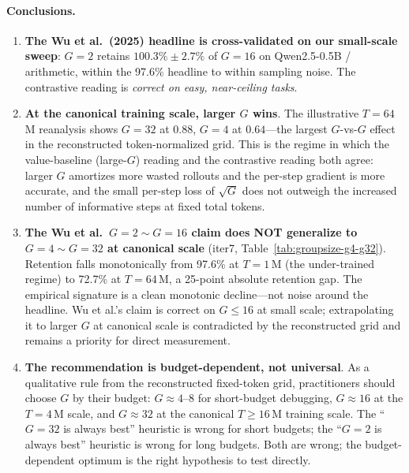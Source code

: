 \paragraph{Conclusions.}
\begin{enumerate}
  \item \textbf{The Wu et al.\ (2025) headline is cross-validated on our
        small-scale sweep}: $G{=}2$ retains $100.3\% \pm 2.7\%$ of
        $G{=}16$ on Qwen2.5-0.5B / arithmetic, within the 97.6\%
        headline to within sampling noise. The contrastive reading is
        \emph{correct on easy, near-ceiling tasks}.
  \item \textbf{At the canonical training scale, larger $G$ wins}.
        The illustrative $T{=}64\,$M reanalysis shows $G{=}32$ at
        $0.88$, $G{=}4$ at $0.64$---the largest $G$-vs-$G$ effect in the
        reconstructed token-normalized grid. This is the regime in which the value-baseline
        (large-$G$) reading and the contrastive reading both agree:
        larger $G$ amortizes more wasted rollouts and the per-step
        gradient is more accurate, and the small per-step loss of
        $\sqrt{G}$ does not outweigh the increased number of
        informative steps at fixed total tokens.
  \item \textbf{The Wu et al.\ $G{=}2{\sim}G{=}16$ claim does NOT
        generalize to $G{=}4{\sim}G{=}32$ at canonical scale}
        (iter7, Table~\ref{tab:groupsize-g4-g32}). Retention falls
        monotonically from 97.6\% at $T{=}1\,$M (the under-trained
        regime) to 72.7\% at $T{=}64\,$M, a 25-point absolute
        retention gap. The empirical signature is a clean monotonic
        decline---not noise around the headline. Wu et al.'s claim is
        correct on $G{\le}16$ at small scale; extrapolating it to
        larger $G$ at canonical scale is contradicted by the reconstructed
        grid and remains a priority for direct measurement.
  \item \textbf{The recommendation is budget-dependent, not universal}.
        As a qualitative rule from the reconstructed fixed-token grid,
        practitioners should choose $G$ by their budget:
        $G{\approx}4$--$8$ for short-budget debugging, $G{\approx}16$ at
        the $T{=}4\,$M scale, and $G{\approx}32$ at the canonical
        $T{\ge}16\,$M training scale. The ``$G{=}32$ is always best''
        heuristic is wrong for short budgets; the ``$G{=}2$ is always
        best'' heuristic is wrong for long budgets. Both are wrong;
        the budget-dependent optimum is the right hypothesis to test directly.

\end{enumerate}
